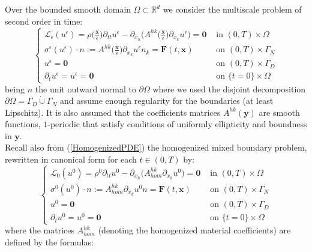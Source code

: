 Over the bounded smooth domain $\Omega \subset \mathbb{R}^d$ we consider the multiscale problem of second order in time:
\begin{equation}
    \label{MainMultiPDE}
    \left \{
    \begin{array}{cc}
        \mathcal{L}_{\epsilon}(u^{\epsilon}) = \rho\big( \frac{\mathbf{x}}{\epsilon} \big) \partial_{tt} u^{\epsilon} - \partial_{x_h} \big( A^{hk}\big( \frac{\mathbf{x}}{\epsilon} \big) \partial_{x_k} u^{\epsilon} \big)  = \mathbf{0} & \text{ in } (0,T)\times \Omega  \\
        \sigma^{\epsilon}(u^{\epsilon})\cdot n := A^{hk}\big( \frac{\mathbf{x}}{\epsilon} \big) \partial_{x_k} u^{\epsilon} n_k  = \mathbf{F}(t,\mathbf{x}) & \text{ on } (0,T) \times \Gamma_N \\
        u^{\epsilon} =  \mathbf{0} & \text{ on } (0,T) \times \Gamma_D \\
        \partial_t u^{\epsilon} = u^{\epsilon} = \mathbf{0} & \text{ on } \{ t=0 \} \times \Omega 
    \end{array}
    \right.
\end{equation}
being $n$ the unit outward normal to $\partial \Omega$ where we used the disjoint decomposition $\partial \Omega = \Gamma_D \dot \cup \Gamma_N$ and assume enough regularity for the boundaries (at least Lipschitz). It is also assumed that the coefficients matrices $A^{hk}(\mathbf{y})$ are smooth functions, $1$-periodic that satisfy conditions of uniformly ellipticity and boundness in $\mathbf{y}$.\\
Recall also from (\ref{HomogenizedPDE}) the homogenized mixed boundary problem, rewritten in canonical form for each $t \in (0,T)$ by:
\begin{equation}
    \label{HomMultiPDE}
    \left \{
    \begin{array}{ccc}
        \mathcal{L}_0 (u^0) = \rho^0 \partial_{tt} u^0 - \partial_{x_h}\big( A^{hk}_{hom} \partial_{x_k} u^0 \big) = \mathbf{0} & \text{ in } (0,T)\times \Omega \\
        \sigma^0(u^0) \cdot n := A^{hk}_{hom} \partial_{x_k}u^0 n = \mathbf{F}(t, \mathbf{x}) & \text{ on } (0,T) \times \Gamma_N \\
        u^0 = \mathbf{0} & \text{ on } (0,T) \times \Gamma_D \\
        \partial_t u^0 = u^0 = \mathbf{0} & \text{ on } \{ t=0 \} \times \Omega
    \end{array}
    \right .
\end{equation}
where the matrices $A^{hk}_{hom}$ (denoting the homogenized material coefficients) are defined by the formulas:
